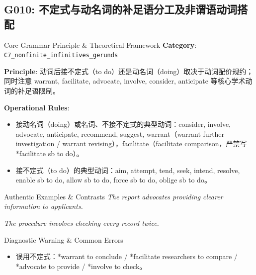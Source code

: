 \subsection{G010: 不定式与动名词的补足语分工及非谓语动词搭配}\label{sec:rule:G010}
\begin{ConceptBox}{Core Grammar Principle \& Theoretical Framework}
\textbf{Category}: \texttt{C7\_nonfinite\_infinitives\_gerunds}\par\vspace{3pt}
\textbf{Principle}: 动词后接不定式（to do）还是动名词（doing）取决于动词配价规约；同时注意 warrant, facilitate, advocate, involve, consider, anticipate 等核心学术动词的补足语限制。\par\vspace{4pt}
\textbf{Operational Rules}:
\begin{itemize}[leftmargin=1.5em, itemsep=1pt]
  \item 接动名词（doing）或名词、不接不定式的典型动词：consider, involve, advocate, anticipate, recommend, suggest, warrant（warrant further investigation / warrant revising），facilitate（facilitate comparison，严禁写 *facilitate sb to do）。
  \item 接不定式（to do）的典型动词：aim, attempt, tend, seek, intend, resolve, enable sb to do, allow sb to do, force sb to do, oblige sb to do。
\end{itemize}
\end{ConceptBox}
\begin{ExampleBox}{Authentic Examples \& Contrasts}
\textit{The report advocates providing clearer information to applicants.}\par\vspace{2pt}
\textit{The procedure involves checking every record twice.}\par\vspace{2pt}
\end{ExampleBox}
\begin{TipBox}{Diagnostic Warning \& Common Errors}
\begin{itemize}[leftmargin=1.5em, itemsep=1pt]
  \item 误用不定式：*warrant to conclude / *facilitate researchers to compare / *advocate to provide / *involve to check。
\end{itemize}
\end{TipBox}
\vspace{6pt}

